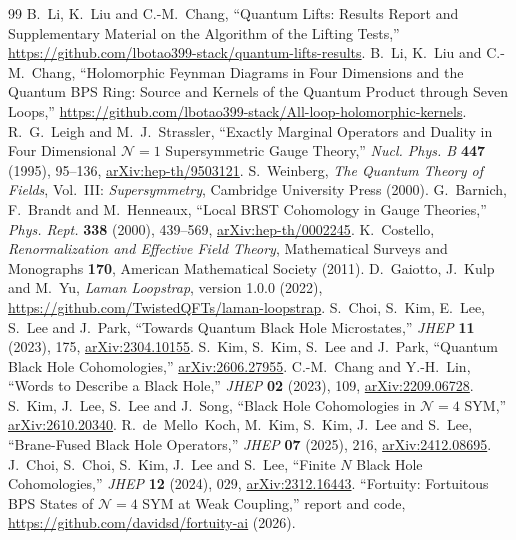 \documentclass[11pt]{article}
\numberwithin{equation}{section}
\numberwithin{figure}{section}
\numberwithin{table}{section}
\begin{document}
\begin{thebibliography}{99}
B.~Li, K.~Liu and C.-M.~Chang, ``Quantum Lifts: Results Report and Supplementary Material on the Algorithm of the Lifting Tests,'' \url{https://github.com/lbotao399-stack/quantum-lifts-results}.
B.~Li, K.~Liu and C.-M.~Chang, ``Holomorphic Feynman Diagrams in Four Dimensions and the Quantum BPS Ring: Source and Kernels of the Quantum Product through Seven Loops,'' \url{https://github.com/lbotao399-stack/All-loop-holomorphic-kernels}.
R.~G.~Leigh and M.~J.~Strassler, ``Exactly Marginal Operators and Duality in Four Dimensional $\mathcal N=1$ Supersymmetric Gauge Theory,'' \emph{Nucl. Phys. B} \textbf{447} (1995), 95--136, \href{https://arxiv.org/abs/hep-th/9503121}{arXiv:hep-th/9503121}.
S.~Weinberg, \emph{The Quantum Theory of Fields}, Vol.~III: \emph{Supersymmetry}, Cambridge University Press (2000).
G.~Barnich, F.~Brandt and M.~Henneaux, ``Local BRST Cohomology in Gauge Theories,'' \emph{Phys. Rept.} \textbf{338} (2000), 439--569, \href{https://arxiv.org/abs/hep-th/0002245}{arXiv:hep-th/0002245}.
K.~Costello, \emph{Renormalization and Effective Field Theory}, Mathematical Surveys and Monographs \textbf{170}, American Mathematical Society (2011).
D.~Gaiotto, J.~Kulp and M.~Yu, \emph{Laman Loopstrap}, version 1.0.0 (2022), \url{https://github.com/TwistedQFTs/laman-loopstrap}.
S.~Choi, S.~Kim, E.~Lee, S.~Lee and J.~Park, ``Towards Quantum Black Hole Microstates,'' \emph{JHEP} \textbf{11} (2023), 175, \href{https://arxiv.org/abs/2304.10155}{arXiv:2304.10155}.
S.~Kim, S.~Kim, S.~Lee and J.~Park, ``Quantum Black Hole Cohomologies,'' \href{https://arxiv.org/abs/2606.27955}{arXiv:2606.27955}.
C.-M.~Chang and Y.-H.~Lin, ``Words to Describe a Black Hole,'' \emph{JHEP} \textbf{02} (2023), 109, \href{https://arxiv.org/abs/2209.06728}{arXiv:2209.06728}.
S.~Kim, J.~Lee, S.~Lee and J.~Song, ``Black Hole Cohomologies in $\mathcal N=4$ SYM,'' \href{https://arxiv.org/abs/2610.20340}{arXiv:2610.20340}.
R.~de~Mello~Koch, M.~Kim, S.~Kim, J.~Lee and S.~Lee, ``Brane-Fused Black Hole Operators,'' \emph{JHEP} \textbf{07} (2025), 216, \href{https://arxiv.org/abs/2412.08695}{arXiv:2412.08695}.
J.~Choi, S.~Choi, S.~Kim, J.~Lee and S.~Lee, ``Finite $N$ Black Hole Cohomologies,'' \emph{JHEP} \textbf{12} (2024), 029, \href{https://arxiv.org/abs/2312.16443}{arXiv:2312.16443}.
``Fortuity: Fortuitous BPS States of $\mathcal N=4$ SYM at Weak Coupling,'' report and code, \url{https://github.com/davidsd/fortuity-ai} (2026).

\end{thebibliography}
\end{document}
